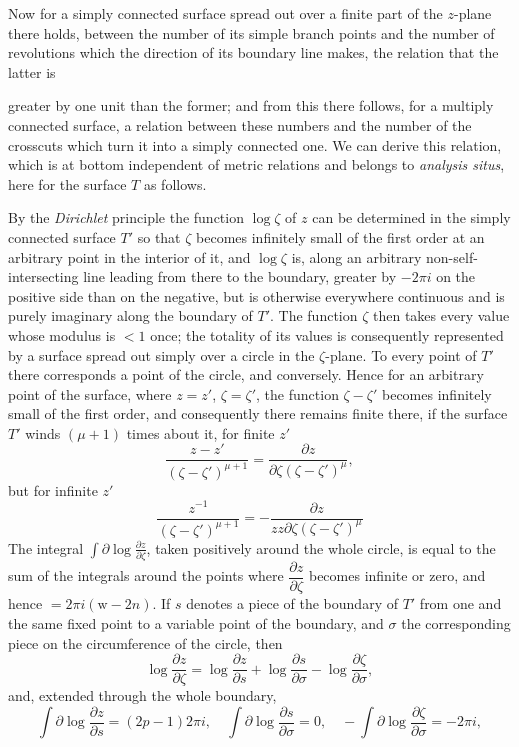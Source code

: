 \documentclass{article}
\begin{document}
Now for a simply connected surface spread out over a finite part of the $z$-plane there holds, between the number of its simple branch points and the number of revolutions which the direction of its boundary line makes, the relation that the latter is

greater by one unit than the former; and from this there follows, for a multiply connected surface, a relation between these numbers and the number of the crosscuts which turn it into a simply connected one. We can derive this relation, which is at bottom independent of metric relations and belongs to \emph{analysis situs}, here for the surface $T$ as follows.

By the \emph{Dirichlet} principle the function $\log\zeta$ of $z$ can be determined in the simply connected surface $T'$ so that $\zeta$ becomes infinitely small of the first order at an arbitrary point in the interior of it, and $\log\zeta$ is, along an arbitrary non-self-intersecting line leading from there to the boundary, greater by $-2\pi i$ on the positive side than on the negative, but is otherwise everywhere continuous and is purely imaginary along the boundary of $T'$. The function $\zeta$ then takes every value whose modulus is $< 1$ once; the totality of its values is consequently represented by a surface spread out simply over a circle in the $\zeta$-plane. To every point of $T'$ there corresponds a point of the circle, and conversely. Hence for an arbitrary point of the surface, where $z = z'$, $\zeta = \zeta'$, the function $\zeta - \zeta'$ becomes infinitely small of the first order, and consequently there remains finite there, if the surface $T'$ winds $(\mu+1)$ times about it, for finite $z'$
\[ \frac{z-z'}{(\zeta-\zeta')^{\mu+1}} = \frac{\partial z}{\partial\zeta(\zeta-\zeta')^{\mu}}, \]
but for infinite $z'$
\[ \frac{z^{-1}}{(\zeta-\zeta')^{\mu+1}} = -\frac{\partial z}{zz \partial\zeta(\zeta-\zeta')^{\mu}} \]
The integral $\displaystyle\int \partial \log \frac{\partial z}{\partial\zeta}$, taken positively around the whole circle, is equal to the sum of the integrals around the points where $\dfrac{\partial z}{\partial\zeta}$ becomes infinite or zero, and hence $= 2\pi i(\mathrm{w} - 2n)$. If $s$ denotes a piece of the boundary of $T'$ from one and the same fixed point to a variable point of the boundary, and $\sigma$ the corresponding piece on the circumference of the circle, then
\[ \log\frac{\partial z}{\partial\zeta} = \log\frac{\partial z}{\partial s} + \log\frac{\partial s}{\partial\sigma} - \log\frac{\partial\zeta}{\partial\sigma}, \]
and, extended through the whole boundary,
\[ \int \partial \log\frac{\partial z}{\partial s} = (2p-1)2\pi i, \quad \int \partial \log\frac{\partial s}{\partial\sigma} = 0, \quad -\int \partial \log\frac{\partial\zeta}{\partial\sigma} = -2\pi i, \]
\end{document}
